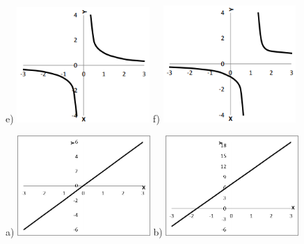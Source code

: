 \begin{respostas}{2}
\begin{figure}[H]
	e) \includegraphics[width=0.45\textwidth]{capitulos/funcao_do_primeiro_grau/media/image30.png} 
	f) \includegraphics[width=0.45\textwidth]{capitulos/funcao_do_primeiro_grau/media/image31.png}
\end{figure}

\begin{figure}[H]
	\ansitem{}

	a) \includegraphics[width=0.45\textwidth]{capitulos/funcao_do_primeiro_grau/media/image32.png} 
	b) \includegraphics[width=0.45\textwidth]{capitulos/funcao_do_primeiro_grau/media/image33.png}
\end{figure}


\end{respostas}
